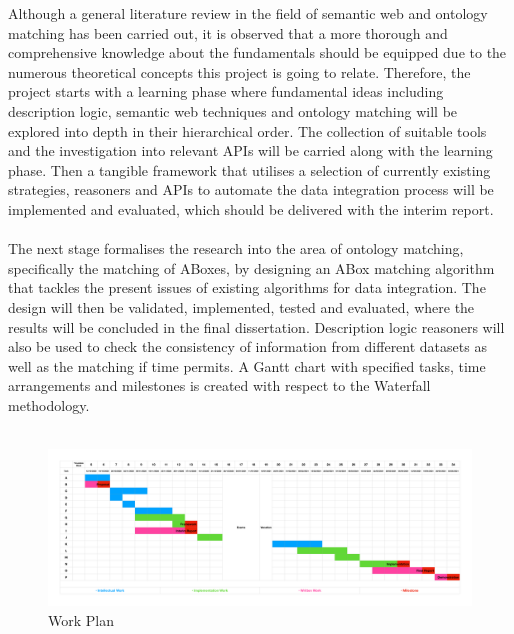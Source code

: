 \documentclass[a4paper,12pt,twoside]{article}
\begin{document}
Although a general literature review in the field of semantic web and ontology matching has been carried out, it is observed that a more thorough and comprehensive knowledge about the fundamentals should be equipped due to the numerous theoretical concepts this project is going to relate. Therefore, the project starts with a learning phase where fundamental ideas including description logic, semantic web techniques and ontology matching will be explored into depth in their hierarchical order. The collection of suitable tools and the investigation into relevant APIs will be carried along with the learning phase. Then a tangible framework that utilises a selection of currently existing strategies, reasoners and APIs to automate the data integration process will be implemented and evaluated, which should be delivered with the interim report.
\\\\
The next stage formalises the research into the area of ontology matching, specifically the matching of ABoxes, by designing an ABox matching algorithm that tackles the present issues of existing algorithms for data integration. The design will then be validated, implemented, tested and evaluated, where the results will be concluded in the final dissertation. Description logic reasoners will also be used to check the consistency of information from different datasets as well as the matching if time permits. A Gantt chart with specified tasks, time arrangements and milestones is created with respect to the Waterfall methodology.
\\\\

\begin{figure}[htbp]
\includegraphics[width=\textwidth]{img/Gantt.pdf}
\caption{Work Plan}
\label{fig:1}
\end{figure}
\end{document}
